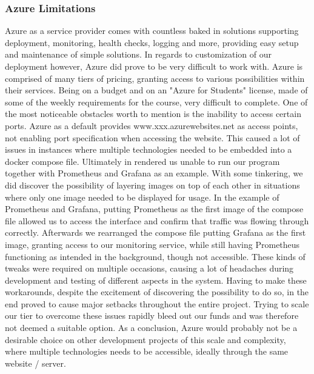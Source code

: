 \documentclass{article}
\begin{document}
    \subsubsection{Azure Limitations}
    Azure as a service provider comes with countless baked in solutions supporting deployment, monitoring, health checks, logging and more, providing easy setup and maintenance of simple solutions. In regards to customization of our deployment however, Azure did prove to be very difficult to work with. Azure is comprised of many tiers of pricing, granting access to various possibilities within their services. Being on a budget and on an "Azure for Students" license, made of some of the weekly requirements for the course, very difficult to complete.
    One of the most noticeable obstacles worth to mention is the inability to access certain ports.
    Azure as a default provides www.{xxx}.azurewebsites.net as access points, not enabling port specification when accessing the website. This caused a lot of issues in instances where multiple technologies needed to be embedded into a docker compose file. Ultimately in rendered us unable to run our program together with Prometheus and Grafana as an example.
    With some tinkering, we did discover the possibility of layering images on top of each other in situations where only one image needed to be displayed for usage. In the example of Prometheus and Grafana, putting Prometheus as the first image of the compose file allowed us to access the interface and confirm that traffic was flowing through correctly. Afterwards we rearranged the compose file putting Grafana as the first image, granting access to our monitoring service, while still having Prometheus functioning as intended in the background, though not accessible.
    These kinds of tweaks were required on multiple occasions, causing a lot of headaches during development and testing of different aspects in the system.
    Having to make these workarounds, despite the excitement of discovering the possibility to do so, in the end proved to cause major setbacks throughout the entire project. Trying to scale our tier to overcome these issues rapidly bleed out our funds and was therefore not deemed a suitable option.
    As a conclusion, Azure would probably not be a desirable choice on other development projects of this scale and complexity, where multiple technologies needs to be accessible, ideally through the same website / server.
    
\end{document}
